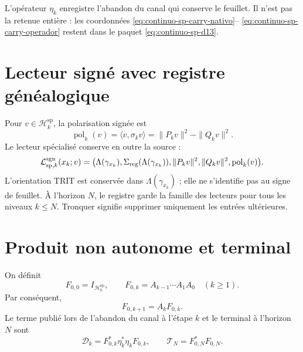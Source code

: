 L'opérateur \(\eta_k\) enregistre l'abandon du canal qui conserve le feuillet. Il
n'est pas la retenue entière : les coordonnées
\eqref{eq:continuo-sp-carry-nativo}--
\eqref{eq:continuo-sp-carry-operador} restent dans le paquet
\eqref{eq:continuo-sp-d13}.

\fi
\section{Lecteur signé avec registre généalogique}

Pour \(v\in\mathcal H_k^{\mathrm{sp}}\), la polarisation signée est
\begin{equation}
\label{eq:continuo-sp-polarizacion-firmada}
 \operatorname{pol}_k(v)
 =\langle v,\sigma_kv\rangle
 =\|P_kv\|^2-\|Q_kv\|^2.
\end{equation}
Le lecteur spécialisé conserve en outre la source :
\begin{equation}
\label{eq:continuo-sp-lector-firmado}
 \mathcal L^{\rm sgn}_{\mathrm{sp},k}(x_k;v)
 =\bigl(
   \Lambda(\gamma_{x_k}),
   \Sigma_{\rm reg}(\Lambda(\gamma_{x_k})),
   \|P_kv\|^2,
   \|Q_kv\|^2,
   \operatorname{pol}_k(v)\bigr).
\end{equation}
L'orientation TRIT est conservée dans \(\Lambda(\gamma_{x_k})\) ; elle ne
s'identifie pas au signe de feuillet. À l'horizon \(N\), le registre garde la
famille des lecteurs pour tous les niveaux \(k\leq N\). Tronquer signifie
supprimer uniquement les entrées ultérieures.

\section{Produit non autonome et terminal}

On définit
\begin{equation}
\label{eq:continuo-sp-f-producto}
 F_{0,0}=I_{\mathcal H_0^{\mathrm{sp}}},
 \qquad
 F_{0,k}=A_{k-1}\cdots A_1A_0
 \quad(k\geq1).
\end{equation}
Par conséquent,
\begin{equation}
\label{eq:continuo-sp-f-recursion}
 F_{0,k+1}=A_kF_{0,k}.
\end{equation}
Le terme publié lors de l'abandon du canal à l'étape \(k\) et le terminal à
l'horizon \(N\) sont
\begin{equation}
\label{eq:continuo-sp-defecto-terminal}
 \mathcal D_k=F_{0,k}^*\eta_k^*\eta_kF_{0,k},
 \qquad
 \mathcal T_N=F_{0,N}^*F_{0,N}.
\end{equation}


